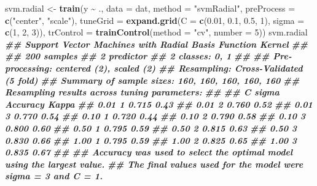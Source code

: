 \documentclass[
]{book}
\newenvironment{Shaded}{\begin{snugshade}}{\end{snugshade}}
\newcommand{\AttributeTok}[1]{\textcolor[rgb]{0.13,0.29,0.53}{#1}}
\newcommand{\DecValTok}[1]{\textcolor[rgb]{0.00,0.00,0.81}{#1}}
\newcommand{\DocumentationTok}[1]{\textcolor[rgb]{0.56,0.35,0.01}{\textbf{\textit{#1}}}}
\newcommand{\FloatTok}[1]{\textcolor[rgb]{0.00,0.00,0.81}{#1}}
\newcommand{\FunctionTok}[1]{\textcolor[rgb]{0.13,0.29,0.53}{\textbf{#1}}}
\newcommand{\NormalTok}[1]{#1}
\newcommand{\OtherTok}[1]{\textcolor[rgb]{0.56,0.35,0.01}{#1}}
\newcommand{\SpecialCharTok}[1]{\textcolor[rgb]{0.81,0.36,0.00}{\textbf{#1}}}
\newcommand{\StringTok}[1]{\textcolor[rgb]{0.31,0.60,0.02}{#1}}
\theoremstyle{definition}
\theoremstyle{definition}
\theoremstyle{definition}
\theoremstyle{definition}
\theoremstyle{remark}
\begin{document}
\begin{Shaded}
\begin{Highlighting}[]
\NormalTok{  svm.radial }\OtherTok{\textless{}{-}} \FunctionTok{train}\NormalTok{(y }\SpecialCharTok{\textasciitilde{}}\NormalTok{ ., }\AttributeTok{data =}\NormalTok{ dat, }\AttributeTok{method =} \StringTok{"svmRadial"}\NormalTok{,}
                \AttributeTok{preProcess =} \FunctionTok{c}\NormalTok{(}\StringTok{"center"}\NormalTok{, }\StringTok{"scale"}\NormalTok{),}
                \AttributeTok{tuneGrid =} \FunctionTok{expand.grid}\NormalTok{(}\AttributeTok{C =} \FunctionTok{c}\NormalTok{(}\FloatTok{0.01}\NormalTok{, }\FloatTok{0.1}\NormalTok{, }\FloatTok{0.5}\NormalTok{, }\DecValTok{1}\NormalTok{), }\AttributeTok{sigma =} \FunctionTok{c}\NormalTok{(}\DecValTok{1}\NormalTok{, }\DecValTok{2}\NormalTok{, }\DecValTok{3}\NormalTok{)),}
                \AttributeTok{trControl =} \FunctionTok{trainControl}\NormalTok{(}\AttributeTok{method =} \StringTok{"cv"}\NormalTok{, }\AttributeTok{number =} \DecValTok{5}\NormalTok{))}
\NormalTok{  svm.radial}
\DocumentationTok{\#\# Support Vector Machines with Radial Basis Function Kernel }
\DocumentationTok{\#\# }
\DocumentationTok{\#\# 200 samples}
\DocumentationTok{\#\#   2 predictor}
\DocumentationTok{\#\#   2 classes: \textquotesingle{}0\textquotesingle{}, \textquotesingle{}1\textquotesingle{} }
\DocumentationTok{\#\# }
\DocumentationTok{\#\# Pre{-}processing: centered (2), scaled (2) }
\DocumentationTok{\#\# Resampling: Cross{-}Validated (5 fold) }
\DocumentationTok{\#\# Summary of sample sizes: 160, 160, 160, 160, 160 }
\DocumentationTok{\#\# Resampling results across tuning parameters:}
\DocumentationTok{\#\# }
\DocumentationTok{\#\#   C     sigma  Accuracy  Kappa}
\DocumentationTok{\#\#   0.01  1      0.715     0.43 }
\DocumentationTok{\#\#   0.01  2      0.760     0.52 }
\DocumentationTok{\#\#   0.01  3      0.770     0.54 }
\DocumentationTok{\#\#   0.10  1      0.720     0.44 }
\DocumentationTok{\#\#   0.10  2      0.790     0.58 }
\DocumentationTok{\#\#   0.10  3      0.800     0.60 }
\DocumentationTok{\#\#   0.50  1      0.795     0.59 }
\DocumentationTok{\#\#   0.50  2      0.815     0.63 }
\DocumentationTok{\#\#   0.50  3      0.830     0.66 }
\DocumentationTok{\#\#   1.00  1      0.795     0.59 }
\DocumentationTok{\#\#   1.00  2      0.825     0.65 }
\DocumentationTok{\#\#   1.00  3      0.835     0.67 }
\DocumentationTok{\#\# }
\DocumentationTok{\#\# Accuracy was used to select the optimal model using the largest value.}
\DocumentationTok{\#\# The final values used for the model were sigma = 3 and C = 1.}
\end{Highlighting}
\end{Shaded}
\end{document}
